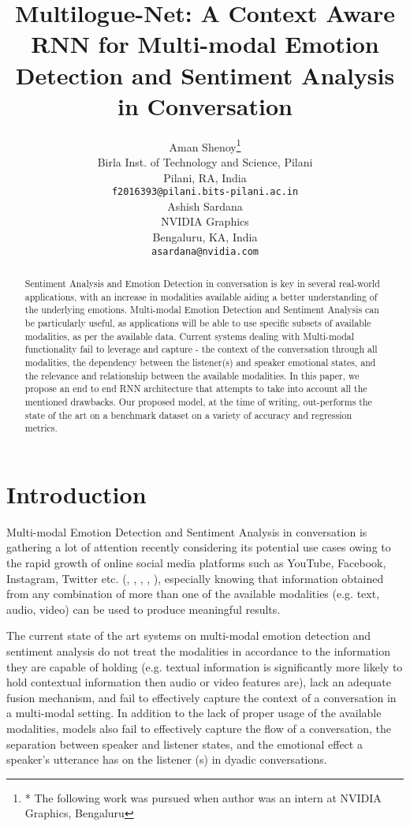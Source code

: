 \documentclass[11pt,a4paper]{article}
\title{Multilogue-Net: A Context Aware RNN for Multi-modal Emotion Detection and Sentiment Analysis in Conversation}
\author{Aman Shenoy\thanks{* The following work was pursued when author was an intern at NVIDIA Graphics, Bengaluru} \\
  Birla Inst. of Technology and Science, Pilani \\
  Pilani, RA, India \\
  \texttt{f2016393@pilani.bits-pilani.ac.in} \\\And
  Ashish Sardana \\
  NVIDIA Graphics \\
  Bengaluru, KA, India\\
  \texttt{asardana@nvidia.com} \\}
\date{}
\begin{document}
\maketitle
\begin{abstract}
Sentiment Analysis and Emotion Detection in conversation is key in several real-world applications, with an increase in modalities available aiding a better understanding of the underlying emotions. Multi-modal Emotion Detection and Sentiment Analysis can be particularly useful, as applications will be able to use specific subsets of available modalities, as per the available data. Current systems dealing with Multi-modal functionality fail to leverage and capture - the context of the conversation through all modalities, the dependency between the listener(s) and speaker emotional states, and the relevance and relationship between the available modalities. In this paper, we propose an end to end RNN architecture that attempts to take into account all the mentioned drawbacks. Our proposed model, at the time of writing, out-performs the state of the art on a benchmark dataset on a variety of accuracy and regression metrics.
\end{abstract}

\section{Introduction}

Multi-modal Emotion Detection and Sentiment Analysis in conversation is gathering a lot of attention recently considering its potential use cases owing to the rapid growth of online social media platforms such as YouTube, Facebook, Instagram, Twitter etc. (\citealp{chen}, \citealp{poria}, \citealp{poria2}, \citealp{zadeh}, \citealp{zadeh2}), especially knowing that information obtained from any combination of more than one of the available modalities (e.g. text, audio, video) can be used to produce meaningful results.  

The current state of the art systems on multi-modal emotion detection and sentiment analysis do not treat the modalities in accordance to the information they are capable of holding (e.g. textual information is significantly more likely to hold contextual information then audio or video features are), lack an adequate fusion mechanism, and fail to effectively capture the context of a conversation in a multi-modal setting. In addition to the lack of proper usage of the available modalities, models also fail to effectively capture the flow of a conversation, the separation between speaker and listener states, and the emotional effect a speaker’s utterance has on the listener (s) in dyadic conversations.  
\end{document}
